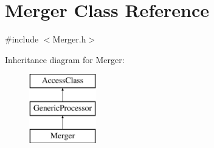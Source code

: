 \hypertarget{classMerger}{\section{Merger Class Reference}
\label{classMerger}
}


{\ttfamily \#include $<$Merger.\-h$>$}

Inheritance diagram for Merger\-:\begin{figure}[H]
\begin{center}
\leavevmode
\includegraphics[height=3.000000cm]{classMerger}
\end{center}
\end{figure}

